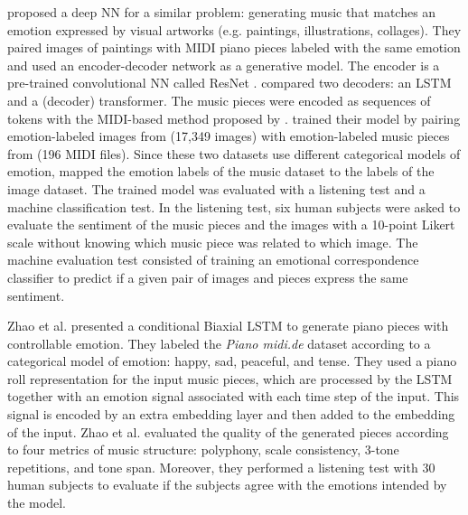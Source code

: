 \citet{tan2020automated} proposed a deep NN for a similar problem: generating music that matches an emotion expressed by visual artworks (e.g. paintings, illustrations, collages). They paired images of paintings with MIDI piano pieces labeled with the same emotion and used an encoder-decoder network as a generative model. The encoder is a pre-trained convolutional NN called ResNet \cite{he2016deep}. \citet{tan2020automated} compared two decoders: an LSTM and a (decoder) transformer. The music pieces were encoded as sequences of tokens with the MIDI-based method proposed by \citet{oore2017learning}. \citet{tan2020automated} trained their model by pairing emotion-labeled images from \citet{you2016building} (17,349 images) with emotion-labeled music pieces from \citet{panda2013multi} (196 MIDI files). Since these two datasets use different categorical models of emotion, \citet{tan2020automated} mapped the emotion labels of the music dataset to the labels of the image dataset. The trained model was evaluated with a listening test and a machine classification test. In the listening test, six human subjects were asked to evaluate the sentiment of the music pieces and the images with a 10-point Likert scale without knowing which music piece was related to which image. The machine evaluation test consisted of training an emotional correspondence classifier to predict if a given pair of images and pieces express the same sentiment.

Zhao et al. \cite{zhao2019emotional} presented a conditional Biaxial LSTM \cite{johnson2017generating} to generate piano pieces with controllable emotion. They labeled the \textit{Piano midi.de} dataset according to a categorical model of emotion: happy, sad, peaceful, and tense. They used a piano roll representation for the input music pieces, which are processed by the LSTM together with an emotion signal associated with each time step of the input. This signal is encoded by an extra embedding layer and then added to the embedding of the input. Zhao et al. \cite{zhao2019emotional} evaluated the quality of the generated pieces according to four metrics of music structure: polyphony, scale consistency, 3-tone repetitions, and tone span. Moreover, they performed a listening test with 30 human subjects to evaluate if the subjects agree with the emotions intended by the model.

